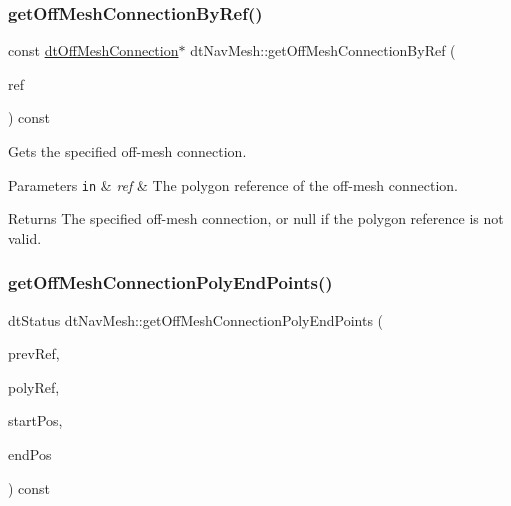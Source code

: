 \subsubsection{\texorpdfstring{get\+Off\+Mesh\+Connection\+By\+Ref()}{getOffMeshConnectionByRef()}\hspace{0.1cm}{\footnotesize\ttfamily [2/2]}}
{\footnotesize\ttfamily const \hyperlink{structdtOffMeshConnection}{dt\+Off\+Mesh\+Connection}$\ast$ dt\+Nav\+Mesh\+::get\+Off\+Mesh\+Connection\+By\+Ref (\begin{DoxyParamCaption}\item[{\hyperlink{group__detour_gab4e0b2257a670c1a800057999612b466}{dt\+Poly\+Ref}}]{ref }\end{DoxyParamCaption}) const}

Gets the specified off-\/mesh connection. 
\begin{DoxyParams}[1]{Parameters}
\mbox{\tt in}  & {\em ref} & The polygon reference of the off-\/mesh connection. \\
\hline
\end{DoxyParams}
\begin{DoxyReturn}{Returns}
The specified off-\/mesh connection, or null if the polygon reference is not valid. 
\end{DoxyReturn}
\mbox{\label{classdtNavMesh_a5f4c392080406146805f674489feac4a}} 
\subsubsection{\texorpdfstring{get\+Off\+Mesh\+Connection\+Poly\+End\+Points()}{getOffMeshConnectionPolyEndPoints()}\hspace{0.1cm}{\footnotesize\ttfamily [1/2]}}
{\footnotesize\ttfamily dt\+Status dt\+Nav\+Mesh\+::get\+Off\+Mesh\+Connection\+Poly\+End\+Points (\begin{DoxyParamCaption}\item[{\hyperlink{group__detour_gab4e0b2257a670c1a800057999612b466}{dt\+Poly\+Ref}}]{prev\+Ref,  }\item[{\hyperlink{group__detour_gab4e0b2257a670c1a800057999612b466}{dt\+Poly\+Ref}}]{poly\+Ref,  }\item[{float $\ast$}]{start\+Pos,  }\item[{float $\ast$}]{end\+Pos }\end{DoxyParamCaption}) const}

